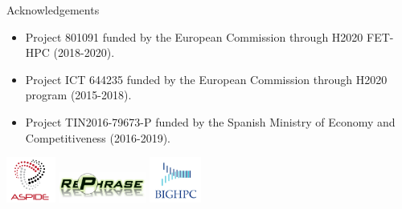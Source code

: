 \begin{frame}[t]{Acknowledgements}
\begin{small}
\begin{itemize}
      \item  Project 801091 
            funded by the European Commission through H2020 FET-HPC (2018-2020).
      \vfill
      \item Project ICT 644235  
            funded by the European Commission through H2020 program (2015-2018).
      \vfill
      \item Project TIN2016-79673-P  
            funded by the Spanish Ministry of Economy and Competitiveness (2016-2019).
\end{itemize}
\end{small}

\vfill
\begin{center}
\includegraphics[height=1.5cm]{logos/aspide.png}
\hspace{1cm}
\includegraphics[height=1cm]{logos/rephrase.jpg}
\hspace{1cm}
\includegraphics[height=1.5cm]{logos/bighpc.png}
\end{center}
\end{frame}

